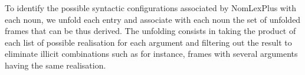 \documentclass[twocolumn,10pt]{article}
\begin{document}
To identify the possible syntactic configurations associated by
NomLexPlus with each noun, we unfold each entry and associate with
each noun the set of unfolded frames that can be thus derived. The
unfolding consists in taking the product of each list of possible
realisation for each argument and filtering out the result to
eliminate illicit combinations such as for instance, frames with
several arguments having the same realisation. %
\end{document}
